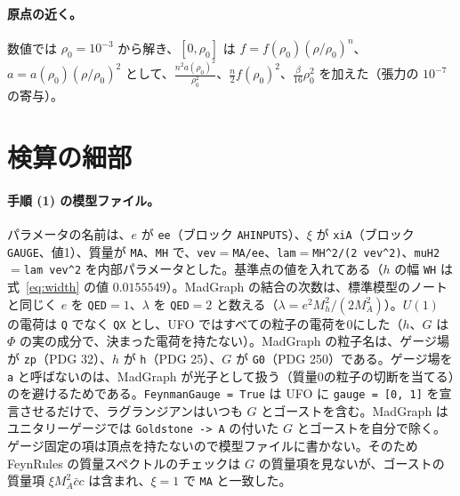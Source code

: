\documentclass[a4paper,10pt]{ltjsarticle}
\begin{document}
\paragraph{原点の近く。}数値では $\rho_0=10^{-3}$ から解き、$[0,\rho_0]$ は $f=f(\rho_0)(\rho/\rho_0)^n$、$a=a(\rho_0)(\rho/\rho_0)^2$ として、$\frac{n^2a(\rho_0)^2}{\rho_0^2}$、$\frac n2f(\rho_0)^2$、$\frac\beta{16}\rho_0^2$ を加えた（張力の $10^{-7}$ の寄与）。

\section{検算の細部}\label{app:details}

\paragraph{手順 (1) の模型ファイル。}パラメータの名前は、$e$ が \texttt{ee}（ブロック \texttt{AHINPUTS}）、$\xi$ が \texttt{xiA}（ブロック \texttt{GAUGE}、値1）、質量が \texttt{MA}、\texttt{MH} で、\texttt{vev}$=$\texttt{MA/ee}、\texttt{lam}$=$\texttt{MH\^{}2/(2 vev\^{}2)}、\texttt{muH2}$=$\texttt{lam vev\^{}2} を内部パラメータとした。基準点の値を入れてある（$h$ の幅 \texttt{WH} は式~\eqref{eq:width} の値 $0.0155549$）。MadGraph の結合の次数は、標準模型のノートと同じく $e$ を \texttt{QED}$=1$、$\lambda$ を \texttt{QED}$=2$ と数える（$\lambda=e^2M_h^2/(2M_A^2)$）。$U(1)$ の電荷は \texttt{Q} でなく \texttt{QX} とし、UFO ではすべての粒子の電荷を0にした（$h$、$G$ は $\Phi$ の実の成分で、決まった電荷を持たない）。MadGraph の粒子名は、ゲージ場が \texttt{zp}（PDG 32）、$h$ が \texttt{h}（PDG 25）、$G$ が \texttt{G0}（PDG 250）である。ゲージ場を \texttt{a} と呼ばないのは、MadGraph が光子として扱う（質量0の粒子の切断を当てる）のを避けるためである。\texttt{FeynmanGauge = True} は UFO に \texttt{gauge = [0, 1]} を宣言させるだけで、ラグランジアンはいつも $G$ とゴーストを含む。MadGraph はユニタリーゲージでは \texttt{Goldstone -> A} の付いた $G$ とゴーストを自分で除く。ゲージ固定の項は頂点を持たないので模型ファイルに書かない。そのため FeynRules の質量スペクトルのチェックは $G$ の質量項を見ないが、ゴーストの質量項 $\xi M_A^2\bar cc$ は含まれ、$\xi=1$ で \texttt{MA} と一致した。
\end{document}
